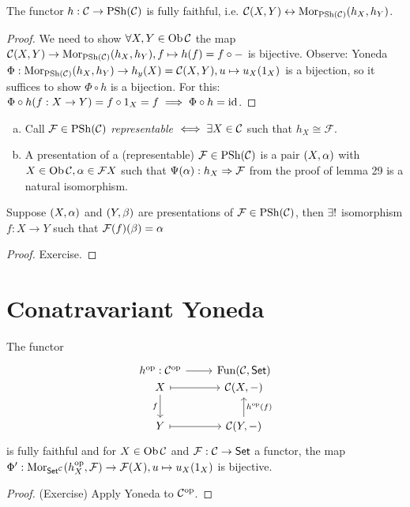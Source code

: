 \documentclass[a4paper]{report}
\begin{document}
\begin{cor}The functor $h : \mathcal{C} \to \mathrm{PSh}(\mathcal{C})$ is fully faithful, i.e. $\mathcal{C}(X,Y) \leftrightarrow \operatorname{Mor}_{\operatorname{PSh} (\mathcal{C})}(h_{X},h_{Y})$.
\begin{proof}
We need to show $\forall X, Y \in \operatorname{Ob} \mathcal{C}$ the map $\mathcal{C}(X,Y) \to \operatorname{Mor}_{\operatorname{PSh}(\mathcal{C})}(h_{X}, h_{Y}), f \mapsto h(f) = f \circ -$ is bijective. Observe: Yoneda $\Phi: \operatorname{Mor}_{\operatorname{PSh}(\mathcal{C})}(h_{X},h_{Y}) \to h_{y}(X) = \mathcal{C}(X,Y), u \mapsto u_{X}(1_{X})$ is a bijection, so it suffices to show $\Phi \circ h$ is a bijection. For this: $\Phi \circ h(f: X \to Y) = f \circ 1_{X} = f \implies \Phi \circ h = \operatorname{id}$.
\end{proof}
\end{cor}

\begin{defi}
\begin{enumerate}[(a)]
  \item Call $\mathcal F \in \operatorname{PSh} (\mathcal{C})$ \emph{representable} $\iff \exists X \in \mathcal{C}$ such that $h_{X} \cong \mathcal F$.
  \item A presentation of a (representable) $\mathcal F \in \operatorname{PSh} (\mathcal{C})$ is a pair $(X,\alpha)$ with $X \in \operatorname{Ob} \mathcal{C}, \alpha \in \mathcal FX$ such that $\Psi(\alpha): h_{X} \Rightarrow \mathcal F$ from the proof of lemma 29 is a natural isomorphism. %
\end{enumerate}
\end{defi}
\begin{prop}
  Suppose $(X, \alpha)$ and $(Y,\beta)$ are presentations of $\mathcal F \in \operatorname{PSh} (\mathcal{C})$, then $\exists!$ isomorphism $f: X \to Y$ such that $\mathcal F(f)(\beta) = \alpha$
  \begin{proof}
Exercise.
  \end{proof}
\end{prop}

\section{Conatravariant Yoneda}
\begin{prop}
  The functor
  \[\begin{tikzcd}
h\op: \C\op \arrow[r]               & \Fun(\C, \Set)                        \\[-20]
X \arrow[r, maps to] \arrow[d, "f"'] & {\C(X, -)}                      \\
Y \arrow[r, maps to]                 & {\C(Y,-)} \arrow[u, "h\op(f)"']
\end{tikzcd}\]
is fully faithful and for $X \in \operatorname{Ob} \mathcal{C}$ and $\mathcal F: \mathcal{C} \to \mathsf{Set}$ a functor, the map $\Phi': \operatorname{Mor}_{\mathsf{Set}^{\mathcal{C}}}(h^\text{op}_{X}, \mathcal F) \to \mathcal F(X), u \mapsto u_{X}(1_{X})$ is bijective.
\begin{proof}
(Exercise) Apply Yoneda to $\mathcal{C}^\text{op}$.
\end{proof}
\end{prop}
\end{document}
